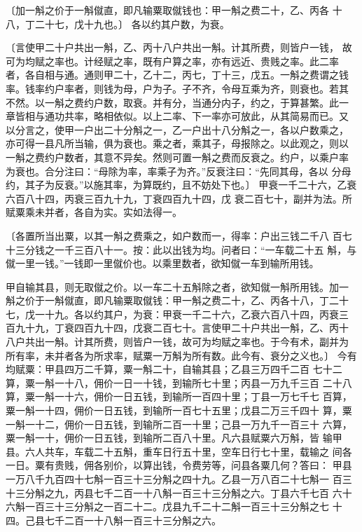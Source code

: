 \documentclass[a4paper,12pt,UTF8,twoside]{ctexbook}
\begin{document}
〔加一斛之价于一斛僦直，即凡输粟取僦钱也：甲一斛之费二十，乙、丙各 十八，丁二十七，戊十九也。〕 各以约其户数，为衰。

〔言使甲二十户共出一斛，乙、丙十八户共出一斛。计其所费，则皆户一钱， 故可为均赋之率也。计经赋之率，既有户算之率，亦有远近、贵贱之率。此二率 者，各自相与通。通则甲二十，乙十二，丙七，丁十三，戊五。一斛之费谓之钱 率。钱率约户率者，则钱为母，户为子。子不齐，令母互乘为齐，则衰也。若其 不然。以一斛之费约户数，取衰。并有分，当通分内子，约之，于算甚繁。此一 章皆相与通功共率，略相依似。以上二率、下一率亦可放此，从其简易而已。又 以分言之，使甲一户出二十分斛之一，乙一户出十八分斛之一，各以户数乘之， 亦可得一县凡所当输，俱为衰也。乘之者，乘其子，母报除之。以此观之，则以 一斛之费约户数者，其意不异矣。然则可置一斛之费而反衰之。约户，以乘户率 为衰也。合分注曰：“母除为率，率乘子为齐。”反衰注曰：“先同其母，各以 分母约，其子为反衰。”以施其率，为算既约，且不妨处下也。〕 甲衰一千二十六，乙衰六百八十四，丙衰三百九十九，丁衰四百九十四，戊 衰二百七十，副并为法。所赋粟乘未并者，各自为实。实如法得一。

〔各置所当出粟，以其一斛之费乘之，如户数而一，得率：户出三钱二千八 百七十三分钱之一千三百八十一。按：此以出钱为均。问者曰：“一车载二十五 斛，与僦一里一钱。”一钱即一里僦价也。以乘里数者，欲知僦一车到输所用钱。

甲自输其县，则无取僦之价。以一车二十五斛除之者，欲知僦一斛所用钱。加一 斛之价于一斛僦直，即凡输粟取僦钱：甲一斛之费二十，乙、丙各十八，丁二十 七，戊一十九。各以约其户，为衰：甲衰一千二十六，乙衰六百八十四，丙衰三 百九十九，丁衰四百九十四，戊衰二百七十。言使甲二十户共出一斛，乙、丙十 八户共出一斛。计其所费，则皆户一钱，故可为均赋之率也。于今有术，副并为 所有率，未并者各为所求率，赋粟一万斛为所有数。此今有、衰分之义也。〕 今有均赋粟：甲县四万二千算，粟一斛二十，自输其县；乙县三万四千二百 七十二算，粟一斛一十八，佣价一日一十钱，到输所七十里；丙县一万九千三百 二十八算，粟一斛一十六，佣价一日五钱，到输所一百四十里；丁县一万七千七 百算，粟一斛一十四，佣价一日五钱，到输所一百七十五里；戊县二万三千四十 算，粟一斛一十二，佣价一日五钱，到输所二百一十里；己县一万九千一百三十 六算，粟一斛一十，佣价一日五钱，到输所二百八十里。凡六县赋粟六万斛，皆 输甲县。六人共车，车载二十五斛，重车日行五十里，空车日行七十里，载输之 间各一日。粟有贵贱，佣各别价，以算出钱，令费劳等，问县各粟几何？答曰： 甲县一万八千九百四十七斛一百三十三分斛之四十九。乙县一万八百二十七斛一 百三十三分斛之九，丙县七千二百一十八斛一百三十三分斛之六。丁县六千七百 六十六斛一百三十三分斛之一百二十二。戊县九千二十二斛一百三十三分斛之七 十四。己县七千二百一十八斛一百三十三分斛之六。
\end{document}
